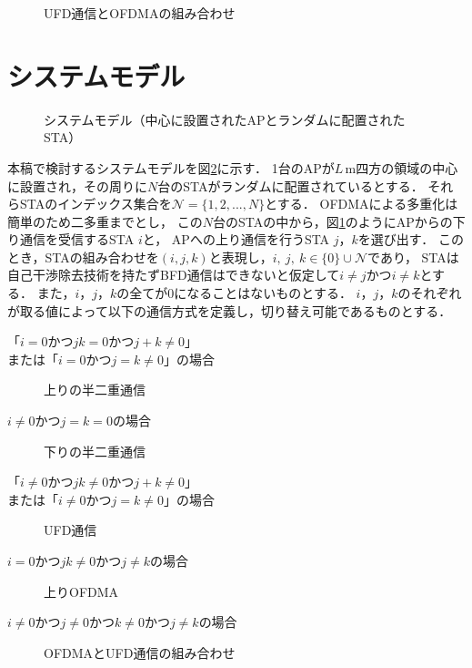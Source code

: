 \documentclass[technicalreport]{ieicej}
\newcommand{\sijk}{(i,j,k)}
\newcommand{\mN}{{\mathcal N}}
\begin{document}
	\begin{figure}[t]
		\centering
		\caption{UFD通信とOFDMAの組み合わせ}
		\label{fig:ofdma}
	\end{figure}

\section{システムモデル}\label{seq:system}
	\begin{figure}[t]
		\centering
		\caption{システムモデル（中心に設置されたAPとランダムに配置されたSTA）}
		\label{fig:model}
	\end{figure}

	本稿で検討するシステムモデルを図\ref{fig:model}に示す．
	1台のAPが$L$\,m四方の領域の中心に設置され，その周りに$N$台のSTAがランダムに配置されているとする．
	それらSTAのインデックス集合を$\mN=\{1,2,...,N\}$とする．
	OFDMAによる多重化は簡単のため二多重までとし，
	この$N$台のSTAの中から，図\ref{fig:ofdma}のようにAPからの下り通信を受信するSTA $i$と，
	APへの上り通信を行うSTA $j$，$k$を選び出す．
	このとき，STAの組み合わせを$\sijk$と表現し，$i,\ j,\ k \in \{0\}\cup \mN$であり，
	STAは自己干渉除去技術を持たずBFD通信はできないと仮定して$i\neq j$かつ$i\neq k$とする．
	また，$i$，$j$，$k$の全てが0になることはないものとする．
	$i$，$j$，$k$のそれぞれが取る値によって以下の通信方式を定義し，切り替え可能であるものとする．
	\begin{description}
		\item[「$i=0$かつ$jk=0$かつ$j+k\neq0$」]\mbox{}
		\item[または「$i=0$かつ$j=k\neq0$」の場合]\mbox{}\par
			上りの半二重通信
		\item[$i\neq0$かつ$j=k=0$の場合]\mbox{}\par
			下りの半二重通信
		\item[「$i\neq0$かつ$jk\neq0$かつ$j+k\neq0$」]\mbox{}
		\item[または「$i\neq0$かつ$j=k\neq0$」の場合]\mbox{}\par
			UFD通信
		\item[$i=0$かつ$jk\neq0$かつ$j\neq k$の場合]\mbox{}\par
			上りOFDMA
		\item[$i\neq0$かつ$j\neq0$かつ$k\neq0$かつ$j\neq k$の場合]\mbox{}\par
			OFDMAとUFD通信の組み合わせ
	\end{description}
	\par
\end{document}
